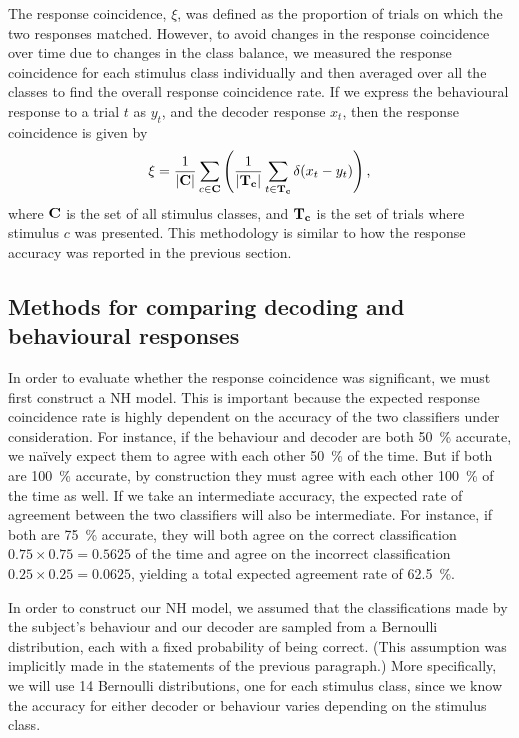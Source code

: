 The response coincidence, $\xi$, was defined as the proportion of trials on which the two responses matched.
However, to avoid changes in the response coincidence over time due to changes in the class balance, we measured the response coincidence for each stimulus class individually and then averaged over all the classes to find the overall response coincidence rate.
If we express the behavioural response to a trial $t$ as $y_t$, and the decoder response $x_t$, then the response coincidence is given by
\begin{equation}
\label{eq:agreement}
\xi = \frac{1}{|\mathbf{C}|} \sum_{c \in \mathbf{C}} \left( \frac{1}{|\mathbf{T_c}|} \sum_{t \in \mathbf{T_c}} \delta(x_t - y_t) \right)
,\end{equation}
where $\mathbf{C}$ is the set of all stimulus classes, and $\mathbf{T_c}$ is the set of trials where stimulus $c$ was presented.
This methodology is similar to how the response accuracy was reported in the previous section.


\subsection{Methods for comparing decoding and behavioural responses}
\label{sec:dec-meth-prob}

In order to evaluate whether the response coincidence was significant, we must first construct a \acf{NH} model.
This is important because the expected response coincidence rate is highly dependent on the accuracy of the two classifiers under consideration.
For instance, if the behaviour and decoder are both \SI{50}{\percent} accurate, we na\"ively expect them to agree with each other \SI{50}{\percent} of the time.
But if both are \SI{100}{\percent} accurate, by construction they must agree with each other \SI{100}{\percent} of the time as well.
If we take an intermediate accuracy, the expected rate of agreement between the two classifiers will also be intermediate.
For instance, if both are \SI{75}{\percent} accurate, they will both agree on the correct classification $0.75 \times 0.75 = 0.5625$ of the time and agree on the incorrect classification $0.25 \times 0.25 = 0.0625$, yielding a total expected agreement rate of \SI{62.5}{\percent}.

In order to construct our \ac{NH} model, we assumed that the classifications made by the subject's behaviour and our decoder are sampled from a Bernoulli distribution, each with a fixed probability of being correct.
(This assumption was implicitly made in the statements of the previous paragraph.)
More specifically, we will use \num{14} Bernoulli distributions, one for each stimulus class, since we know the accuracy for either decoder or behaviour varies depending on the stimulus class.

